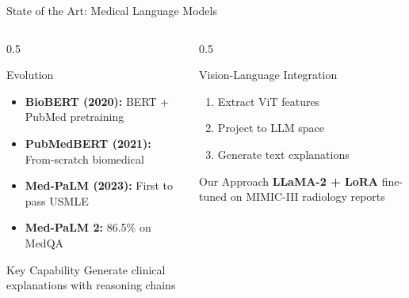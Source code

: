 \documentclass[aspectratio=169]{beamer}
\begin{document}
\begin{frame}{State of the Art: Medical Language Models}
    \begin{columns}
        \begin{column}{0.5\textwidth}
            \begin{block}{Evolution}
                \begin{itemize}
                    \item \textbf{BioBERT (2020):} BERT + PubMed pretraining
                    \item \textbf{PubMedBERT (2021):} From-scratch biomedical
                    \item \textbf{Med-PaLM (2023):} First to pass USMLE
                    \item \textbf{Med-PaLM 2:} 86.5\% on MedQA
                \end{itemize}
            \end{block}
            
            \begin{block}{Key Capability}
                Generate clinical explanations with reasoning chains
            \end{block}
        \end{column}
        \begin{column}{0.5\textwidth}
            \begin{block}{Vision-Language Integration}
                \begin{enumerate}
                    \item Extract ViT features
                    \item Project to LLM space
                    \item Generate text explanations
                \end{enumerate}
            \end{block}
            
            \begin{alertblock}{Our Approach}
                \textbf{LLaMA-2 + LoRA} fine-tuned on MIMIC-III radiology reports
            \end{alertblock}
        \end{column}
    \end{columns}
\end{frame}
\end{document}
